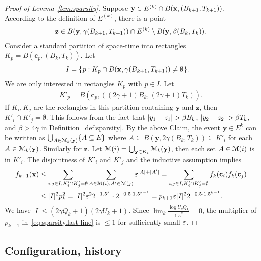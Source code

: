 \documentclass[11pt]{memoir}
\theoremstyle{definition} %
\renewcommand{\le}{\leq}
\renewcommand{\vek}[1]{\mathbf{#1}}
\def\B{B}
\def\U{U}
\newcommand{\Q}{Q} %
\newcommand{\Tu}{T}
\newcommand{\x}{\vek{x}} %
\newcommand{\y}{\vek{y}} %
\begin{document}
\begin{proof}[Proof of Lemma~\ref{lem:sparsity}]
 Suppose \( \y \in E^{(k)}\cap B(\x,\pair{\B_{k+1}}{\Tu_{k+1}}) \).
According to the definition of \( E^{(k)} \),  there is a point
\begin{align}\label{eq:sparse-as}
 \vek{z} \in
 B(\y,\gamma\pair{\B_{k+1}}{\Tu_{k+1}})\cap E^{(k)}\setminus B(\y,\beta\pair{\B_{k}}{\Tu_{k}}).
 \end{align}
Consider a standard partition of space-time into rectangles \(  K_{p}=B(\vek{c}_{p},(\B_{k},\Tu_{k})) \).
Let 
\begin{align*}
       I&=\setOf{p}{K_{p}\cap B(\x,\gamma\pair{\B_{k+1}}{\Tu_{k+1}})\ne\emptyset}.
 \end{align*}
 We are only interested in rectangles \( K_{p} \) with \( p\in I \).
 Let
\begin{align*}
  K'_{p}=B(\vek{c}_{p},((2\gamma+1)\B_{k},(2\gamma+1)\Tu_{k})) .
\end{align*}
If \( K_{i},K_{j} \) are the rectangles in this partition containing \( \y \) and \( \vek{z} \), then
\( K'_{i}\cap K'_{j}=\emptyset \).
This follows from the fact that \( \abs{y_{1} - z_{1}}>\beta\B_{k} \),
\( \abs{y_{2} - z_{2}}>\beta\Tu_{k} \), and \( \beta> 4\gamma \) 
in Definition~\ref{def:sparsity}.
By the above Claim, the event \( \y\in E^{k} \) can be written as
\( \bigcup_{A\in\cM_{k}(\y)}\{A\subseteq E\} \)
where \( A\subseteq B(\y,2\gamma(B_{k},\Tu_{k}))\subseteq K'_{i} \)
for each \( A\in\cM_{k}(\y) \).
Similarly for \( \vek{z} \).
Let \( \cM(i)=\bigcup_{\y\in K_{i}}\cM_{k}(\y) \), then each set \( A\in\mathcal{M}(i) \) is in \( K'_{i} \).
The disjointness of \( K'_{i} \) and \( K'_{j} \) and the inductive assumption implies
\begin{align}\nonumber
  f_{k+1}(\x) &\le \sum_{i,j\in I, K'_{i}\cap K'_{j}=\emptyset}\sum_{A\in\cM(i),A'\in\cM(j)}\eps^{|A|+|A'|}
   =\sum_{i,j\in I, K'_{i}\cap K'_{j}=\emptyset}f_{k}(\vek{c}_{i})f_{k}(\vek{c}_{j})
  \\\label{eq:sparsity.last-line}&\le |I|^{2}p_{k}^{2} = |I|^{2}\eps^{2} 2^{-1.5^{k}}\cdot 2^{-0.5\cdot 1.5^{k-1}}
       = p_{k+1}\eps |I|^{2}2^{-0.5\cdot 1.5^{k-1}}.
\end{align}
We have  \( |I|\le (2\gamma \Q_{k}+1)(2\gamma\U_{k}+1) \).
Since \( \lim_{k}\frac{\log\U_{k}\Q_{k}}{1.5^k}=0 \), 
the multiplier of \( p_{k+1} \) in~\eqref{eq:sparsity.last-line} is \( \le 1 \) for sufficiently small  \( \varepsilon \).
\end{proof}

\subsection{Configuration, history}\label{sec:gen-TM}
\end{document}
